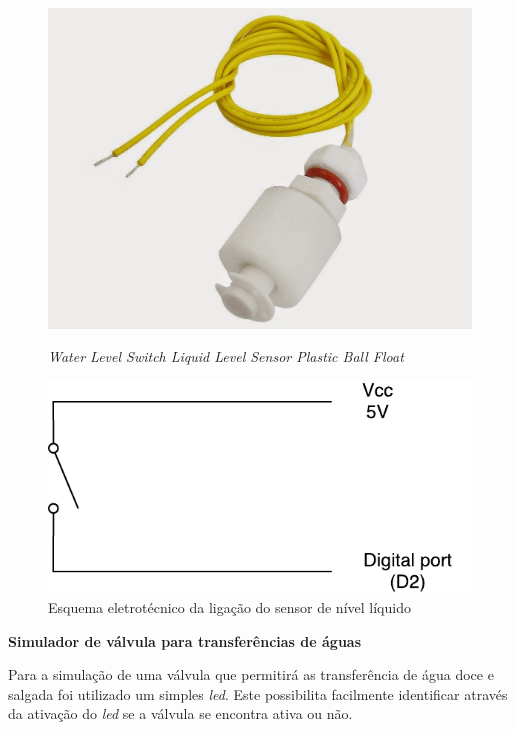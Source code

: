 \begin{figure}[h]
	\centering
	\begin{minipage}[b]{0.4\textwidth}
		\includegraphics[width=\textwidth]{img/hardware/liquido.JPG}
		\caption{\textit{Water Level Switch Liquid Level Sensor Plastic Ball Float}}
	\end{minipage}
	\hfill
	\begin{minipage}[b]{0.4\textwidth}
		\includegraphics[width=\textwidth]{img/hardware/sw_esquema.pdf}
		\caption{Esquema eletrotécnico da ligação do sensor de nível líquido}
		\label{esquem-liquido}
	\end{minipage}
\end{figure} 


\newpage
\textbf{Simulador de válvula para transferências de águas}

Para a simulação de uma válvula que permitirá as transferência de água doce e salgada foi utilizado um simples \textit{led}. Este possibilita facilmente identificar através da ativação do \textit{led} se a válvula se encontra ativa ou não. 


